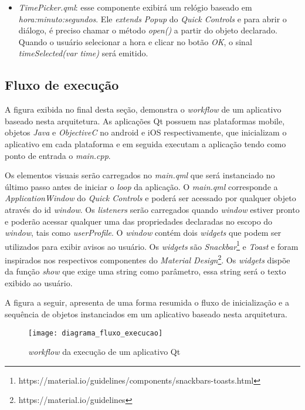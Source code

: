 \begin{itemize}
	\item \textit{TimePicker.qml}: esse componente exibirá um relógio baseado em \textit{hora:minuto:segundos}. Ele \textit{extends} \textit{Popup} do \textit{Quick Controls} e para abrir o diálogo, é preciso chamar o método \textit{open()} a partir do objeto declarado. Quando o usuário selecionar a hora e clicar no botão \textit{OK}, o sinal \textit{timeSelected(var time)} será emitido.
\end{itemize}


\subsection{Fluxo de execução}\label{sec:solucao-desenvolvida}
A figura exibida no final desta seção, demonstra o \textit{workflow} de um aplicativo baseado nesta arquitetura. As aplicações Qt possuem nas plataformas mobile, objetos \textit{Java} e \textit{ObjectiveC} no android e iOS respectivamente, que inicializam o aplicativo em cada plataforma e em seguida executam a aplicação tendo como ponto de entrada o \textit{main.cpp}.\par

Os elementos visuais serão carregados no \textit{main.qml} que será instanciado no último passo antes de iniciar o \textit{loop} da aplicação. O \textit{main.qml} corresponde a \textit{ApplicationWindow} do \textit{Quick Controls} e poderá ser acessado por qualquer objeto através do id \textit{window}. Os \textit{listeners} serão carregados quando \textit{window} estiver pronto e poderão acessar qualquer uma das propriedades declaradas no escopo do \textit{window}, tais como \textit{userProfile}. O \textit{window} contém dois \textit{widgets} que podem ser utilizados para exibir avisos ao usuário. Os \textit{widgets} são \textit{Snackbar}\footnote{https://material.io/guidelines/components/snackbars-toasts.html} e \textit{Toast} e foram inspirados nos respectivos componentes do \textit{Material Design}\footnote{https://material.io/guidelines}. Os \textit{widgets} dispõe da função \textit{show} que exige uma string como parâmetro, essa string será o texto exibido ao usuário.\par

A figura a seguir, apresenta de uma forma resumida o fluxo de inicialização e a sequência de objetos instanciados em um aplicativo baseado nesta arquitetura.

\begin{figure}[H]
	\texttt{[image: diagrama\_fluxo\_execucao]}
	\centering
	\caption{\textit{workflow} da execução de um aplicativo Qt}
\end{figure}


